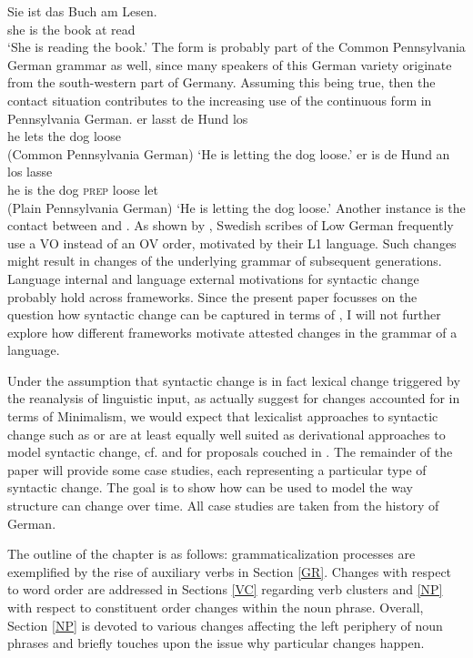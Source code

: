 \documentclass[output=paper
                ,modfonts
                ,nonflat
	        ,collection
	        ,collectionchapter
	        ,collectiontoclongg
 	        ,biblatex
                ,babelshorthands
                ,newtxmath
                ,draftmode
                ,colorlinks, citecolor=brown
]{./langsci/langscibook}
\begin{document}
{\ea
\gll Sie ist das Buch am Lesen. \\ she is the book at read \\
\glt `She is reading the book.'
\z
The form is probably part of the Common Pennsylvania German grammar as well, since many speakers of this German variety originate from the south-western part of Germany. Assuming this being true, then the contact situation contributes to the increasing use of the continuous form in Pennsylvania German.
}      
\eal
\ex
\gll er lasst de Hund los \\ he lets the dog loose \\  \hfill (Common Pennsylvania German)
\glt `He is letting the dog loose.'
\ex
\gll er is de Hund an los lasse \\ he is the dog \textsc{prep} loose let \\  \hfill (Plain Pennsylvania German)
\glt `He is letting the dog loose.'
\zl
Another instance is the contact between  and . As shown by \cite[149]{petzell2016}, Swedish scribes of Low German frequently use a VO instead of an OV order, motivated by their L1 language. Such changes might result in changes of the underlying grammar of subsequent generations. Language internal and language external motivations for syntactic change probably hold across frameworks. Since the present paper focusses on the question how syntactic change can be captured in terms of \hpsg, I will not further explore how different frameworks motivate attested changes in the grammar of a language. 

Under the assumption that syntactic change is in fact lexical change triggered by the reanalysis of linguistic input, as \cite{BiWa2015} actually suggest for changes accounted for in terms of Minimalism, we would expect that lexicalist approaches to syntactic change such as \hpsg or \lfg are at least equally well suited as derivational approaches to model syntactic change, cf. \cite{vincent2001} and \cite{BoVi2017} for proposals couched in \lfg. The remainder of the paper will provide some case studies, each representing a particular type of syntactic change. The goal is to show how \hpsg can be used to model the way structure can change over time. All case studies are taken from the history of German.
 
The outline of the chapter is as follows: grammaticalization processes are exemplified by the rise of auxiliary verbs in Section \ref{GR}. Changes with respect to word order are addressed in Sections \ref{VC} regarding verb clusters and \ref{NP} with respect to constituent order changes within the noun phrase. Overall, Section \ref{NP} is devoted to various changes affecting the left periphery of noun phrases and briefly touches upon the issue why particular changes happen.  
\end{document}
